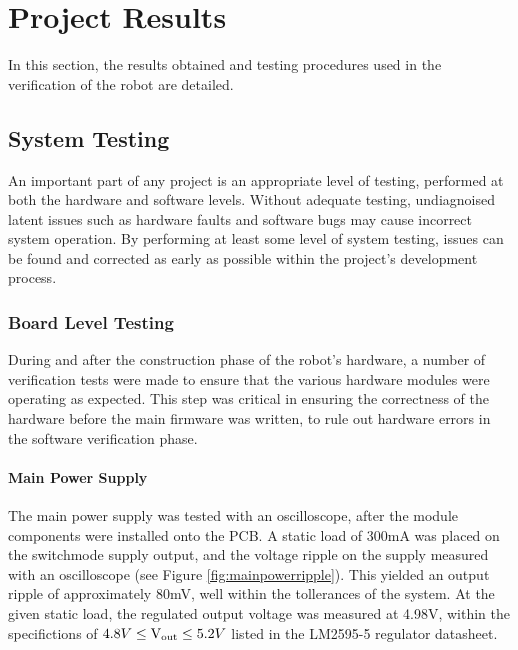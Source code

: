 \chapter{Project Results}
\label{chp:results}

In this section, the results obtained and testing procedures used in the verification of the robot are detailed.

\section{System Testing}

An important part of any project is an appropriate level of testing, performed at both the hardware and software levels. Without adequate testing, undiagnoised latent issues such as hardware faults and software bugs may cause incorrect system operation. By performing at least some level of system testing, issues can be found and corrected as early as possible within the project's development process.

\FloatBarrier
\subsection{Board Level Testing}

During and after the construction phase of the robot's hardware, a number of verification tests were made to ensure that the various hardware modules were operating as expected. This step was critical in ensuring the correctness of the hardware before the main firmware was written, to rule out hardware errors in the software verification phase.

\FloatBarrier
\subsubsection{Main Power Supply}

The main power supply was tested with an oscilloscope, after the module components were installed onto the PCB. A static load of 300mA was placed on the switchmode supply output, and the voltage ripple on the supply measured with an oscilloscope (see Figure \ref{fig:mainpowerripple}). This yielded an output ripple of approximately 80mV, well within the tollerances of the system. At the given static load, the regulated output voltage was measured at 4.98V, within the specifictions of \(4.8V\leq\text{V\ensuremath{_{\textrm{out}}}}\leq5.2V\) listed in the LM2595-5 regulator datasheet.

